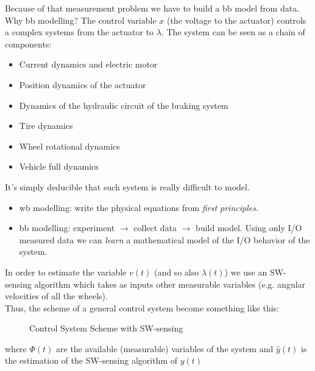 Because of that measurement problem we have to build a \acrlong{bb} model from data.\\

Why \acrlong{bb} modelling?
The control variable $x$ (the voltage to the actuator) controls a complex systems from the actuator to $\lambda$.
The system can be seen as a chain of components:
\begin{itemize}
    \item Current dynamics and electric motor
    \item Position dynamics of the actuator
    \item Dynamics of the hydraulic circuit of the braking system
    \item Tire dynamics
    \item Wheel rotational dynamics
    \item Vehicle full dynamics
\end{itemize}

It's simply deducible that such system is really difficult to model.

\begin{remark}
    \hfill \break
    \begin{itemize}
	   \item \gls{wb} modelling: write the physical equations from \emph{first principles}.
	   \item \gls{bb} modelling: experiment $\rightarrow$ collect data $\rightarrow$ build model.
        Using only I/O measured data we can \emph{learn} a mathematical model of the I/O behavior of the system.
    \end{itemize}
\end{remark}

In order to estimate the variable $v(t)$ (and so also $\lambda(t)$) we use an SW-sensing algorithm which takes as inputs other measurable variables (e.g. angular velocities of all the wheels). \\
Thus, the scheme of a general control system become something like this: 

\begin{figure}[H]
    \centering
	\caption*{Control System Scheme with SW-sensing}
\end{figure}
where $\Phi(t)$ are the available (measurable) variables of the system and $\hat{y}(t)$ is the estimation of the SW-sensing algorithm of $y(t)$

